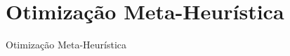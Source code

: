 \section{Otimização Meta-Heurística}
\label{s.optimization}

\begin{frame}{Otimização Meta-Heurística}
\end{frame}